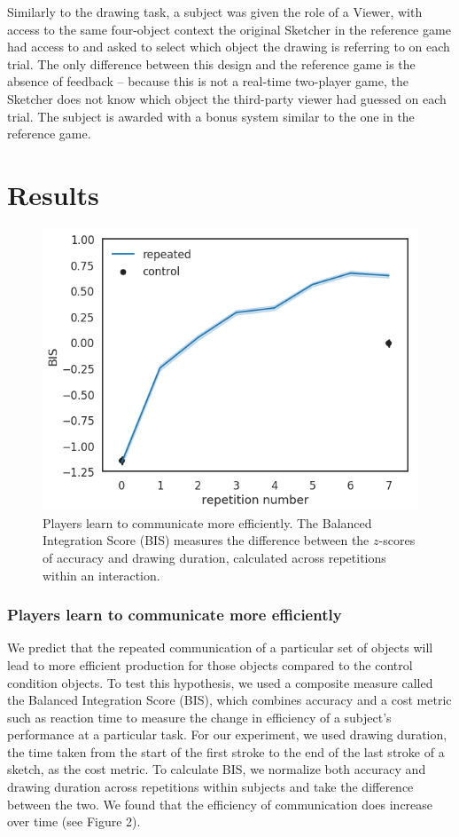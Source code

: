 \documentclass[10pt,letterpaper]{article}
\begin{document}
Similarly to the drawing task, a subject was given the role of a Viewer, with access to the same four-object context the original Sketcher in the reference game had access to and asked to select which object the drawing is referring to on each trial. The only difference between this design and the reference game is the absence of feedback -- because this is not a real-time two-player game, the Sketcher does not know which object the third-party viewer had guessed on each trial. The subject is awarded with a bonus system similar to the one in the reference game.

\section{Results}

\begin{figure}
\includegraphics[width=\linewidth]{fig_2.png}
\caption{Players learn to communicate more efficiently. The Balanced Integration Score (BIS) measures the difference between the $z$-scores of accuracy and drawing duration, calculated across repetitions within an interaction.} \label{fig:1a}
\end{figure}

\subsubsection{Players learn to communicate more efficiently} We predict that the repeated communication of a particular set of objects will lead to more efficient production for those objects compared to the control condition objects. To test this hypothesis, we used a composite measure called the Balanced Integration Score (BIS), which combines accuracy and a cost metric such as reaction time to measure the change in efficiency of a subject's performance at a particular task. For our experiment, we used drawing duration, the time taken from the start of the first stroke to the end of the last stroke of a sketch, as the cost metric. To calculate BIS, we normalize both accuracy and drawing duration across repetitions within subjects and take the difference between the two. We found that the efficiency of communication does increase over time (see Figure 2).
\end{document}
